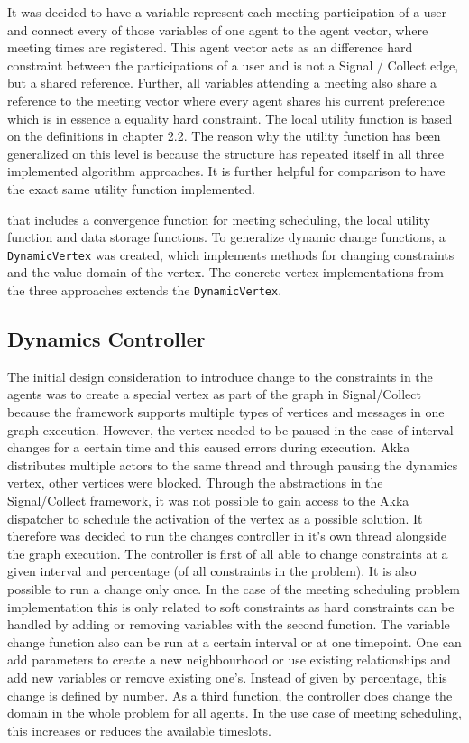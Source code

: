 It was decided to have a variable represent each meeting participation of a user and connect every of those variables of one agent to the agent vector, where meeting times are registered. This agent vector acts as an difference hard constraint between the participations of a user and is not a Signal / Collect edge, but a shared reference. Further, all variables attending a meeting also share a reference to the meeting vector where every agent shares his current preference which is in essence a equality hard constraint. 
The local utility function is based on the definitions in chapter 2.2. The reason why the utility function has been generalized on this level is because the structure has repeated itself in all three implemented algorithm approaches. It is further helpful for comparison to have the exact same utility function implemented.

 that includes a convergence function for meeting scheduling, the local utility function and data storage functions. 
To generalize dynamic change functions, a \texttt{DynamicVertex} was created, which implements methods for changing constraints and the value domain of the vertex. The concrete vertex implementations from the three approaches extends the \texttt{DynamicVertex}.

\subsection{Dynamics Controller}

The initial design consideration to introduce change to the constraints in the agents was to create a special vertex as part of the graph in Signal/Collect because the framework supports multiple types of vertices and messages in one graph execution. However, the vertex needed to be paused in the case of interval changes for a certain time and this caused errors during execution. Akka distributes multiple actors to the same thread and through pausing the dynamics vertex, other vertices were blocked. Through the abstractions in the Signal/Collect framework, it was not possible to gain access to the Akka dispatcher to schedule the activation of the vertex as a possible solution. It therefore was decided to run the changes controller in it's own thread alongside the graph execution.\newline\newline
The controller is first of all able to change constraints at a given interval and percentage (of all constraints in the problem). It is also possible to run a change only once. In the case of the meeting scheduling problem implementation this is only related to soft constraints as hard constraints can be handled by adding or removing variables with the second function. The variable change function also can be run at a certain interval or at one timepoint.  One can add parameters to create a new neighbourhood or use existing relationships and add new variables or remove existing one's. Instead of given by percentage, this change is defined by number. As a third function, the controller does change the domain in the whole problem for all agents. In the use case of meeting scheduling, this increases or reduces the available timeslots.

